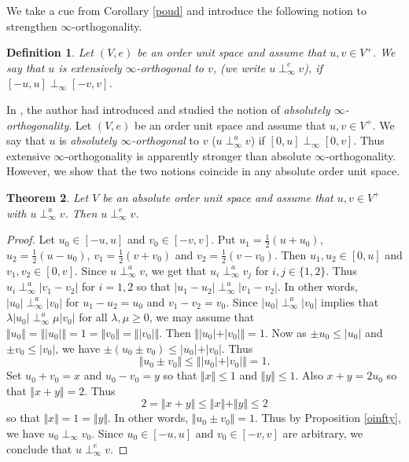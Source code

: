\documentclass[12pt]{amsart}
\newtheorem{theorem}{Theorem}[section]
\newtheorem{definition}[theorem]{Definition}
\begin{document}
We take a cue from Corollary \ref{poud} and introduce the following notion to strengthen  $\infty$-orthogonality. 
\begin{definition}
	Let $(V, e)$ be an order unit space and assume that $u, v \in V^+$. We say that $u$ is \emph{extensively $\infty$-orthogonal} to $v$, (we write $u \perp_{\infty}^e v$), if $[- u, u] \perp_{\infty} [- v, v]$. 
\end{definition} 
In \cite{K16, K18}, the author had introduced and studied the notion of \emph{absolutely $\infty$-orthogonality}. Let $(V, e)$ be an order unit space and assume that $u, v \in V^+$. We say that $u$ is \emph{absolutely $\infty$-orthogonal} to $v$ ($u \perp_{\infty}^a v$) if $[0, u] \perp_{\infty} [0, v]$. Thus extensive $\infty$-orthogonality is apparently stronger than absolute $\infty$-orthogonality. However, we show that the two notions coincide in any absolute order unit space. 
\begin{theorem}\label{e=a}
	Let $V$ be an absolute order unit space and assume that $u, v \in V^+$ with $u \perp_{\infty}^a v$. Then $u \perp_{\infty}^e v$. 
\end{theorem} 
\begin{proof}
	Let $u_0 \in [- u, u]$ and $v_0 \in [- v, v]$. Put $u_1 = \frac 12 (u + u_0)$, $u_2 = \frac 12 (u - u_0)$, $v_1 = \frac 12 (v + v_0)$ and $v_2 = \frac 12 (v - v_0)$. Then $u_1, u_2 \in [0, u]$ and $v_1, v_2 \in [0, v]$. Since $u \perp_{\infty}^a v$, we get that $u_i \perp_{\infty}^a v_j$ for $i, j \in \lbrace 1, 2 \rbrace$. Thus $u_i \perp_{\infty}^a \vert v_1 - v_2 \vert$ for $i = 1, 2$ so that $\vert u_1 - u_2 \vert \perp_{\infty}^a \vert v_1 - v_2 \vert$. In other words, $\vert u_0 \vert \perp_{\infty}^a \vert v_0 \vert$ for $u_1 - u_2 = u_0$ and $v_1 - v_2 = v_0$. Since  $\vert u_0 \vert \perp_{\infty}^a \vert v_0 \vert$ implies that $\lambda \vert u_0 \vert \perp_{\infty}^a \mu \vert v_0 \vert$ for all $\lambda, \mu \ge 0$, we may assume that $\Vert u_0 \Vert = \Vert \vert u_0 \vert \Vert = 1 = \Vert v_0 \Vert = \Vert \vert v_0 \vert \Vert$. Then $\Vert \vert u_0 \vert + \vert v_0 \vert \Vert = 1$. Now as $\pm u_0 \le \vert u_0 \vert$ and $\pm v_0 \le \vert v_0 \vert$, we have $\pm (u_0 \pm v_0) \le \vert u_0 \vert + \vert v_0 \vert$. Thus 
	$$\Vert u_0 \pm v_0 \Vert \le \Vert \vert u_0 \vert + \vert v_0 \vert \Vert = 1.$$ 
	Set $u_0 + v_0 = x$ and $u_0 - v_0 = y$ so that $\Vert x \Vert \le 1$ and $\Vert y \Vert \le 1$. Also $x + y = 2 u_0$ so that $\Vert x + y \Vert = 2$. Thus 
	$$2 = \Vert x + y \Vert \le \Vert x \Vert + \Vert y \Vert \le 2$$ 
	so that $\Vert x \Vert = 1 = \Vert y \Vert$. In other words, $\Vert u_0 \pm v_0 \Vert = 1$. Thus by Proposition \ref{oinfty}, we have $u_0 \perp_{\infty} v_0$. Since $u_0 \in [- u, u]$ and $v_0 \in [- v, v]$ are arbitrary, we conclude that $u \perp_{\infty}^e v$. 
\end{proof} 
\end{document}
